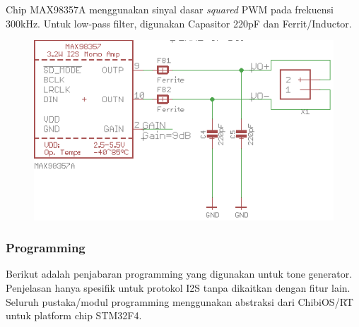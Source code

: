 \documentclass[12pt,]{article}
\begin{document}
	\newpage
	Chip MAX98357A menggunakan sinyal dasar \textit{squared} PWM pada frekuensi 300kHz.
	Untuk low-pass filter, digunakan Capasitor 220pF dan Ferrit/Inductor.
	\begin{figure}[H]
		\centering
		\includegraphics[width=0.6\linewidth]{images/max98357A}
	\end{figure}

	\subsubsection{Programming}
	Berikut adalah penjabaran programming yang digunakan untuk tone generator.
	Penjelasan hanya spesifik untuk protokol I2S tanpa dikaitkan dengan fitur lain.
	Seluruh pustaka/modul programming menggunakan abstraksi dari ChibiOS/RT untuk platform chip STM32F4.
	
\end{document}
